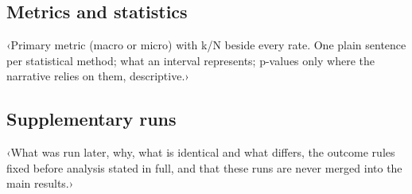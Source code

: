 \subsection{Metrics and statistics}
\label{sec:metrics}
‹Primary metric (macro or micro) with k/N beside every rate. One plain sentence per statistical method; what an interval represents; p-values only where the narrative relies on them, descriptive.›

\subsection{Supplementary runs}
\label{sec:supp-method}
‹What was run later, why, what is identical and what differs, the outcome rules fixed before analysis stated in full, and that these runs are never merged into the main results.›
